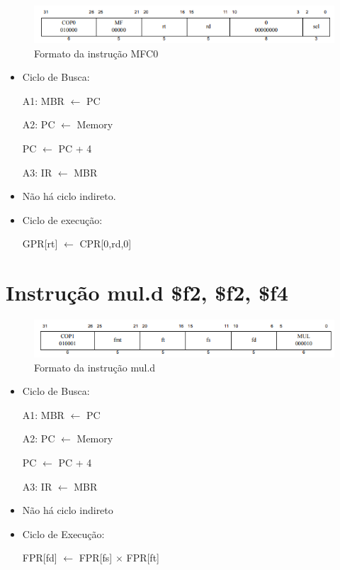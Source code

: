 \documentclass[
	12pt,				%
	oneside,			%
	a4paper,			%
	english,			%
	brazil				%
	]{abntex2ppgsi}
\begin{document}
\begin{figure}[h]
    \centering
    \includegraphics[width=1\linewidth]{4_15.png}
    \caption{Formato da instrução MFC0}
    \label{fig4_15}
\end{figure}

\begin{itemize}
    \item Ciclo de Busca:

    A1: MBR $\leftarrow$ PC

    A2: PC $\leftarrow$ Memory

    PC $\leftarrow$ PC + 4

    A3: IR $\leftarrow$ MBR
    \item Não há ciclo indireto.
    \item Ciclo de execução:

     GPR[rt] $\leftarrow$ CPR[0,rd,0]
\end{itemize}

\section{Instrução mul.d \$f2, \$f2, \$f4}

\begin{figure}[h]
    \centering
    \includegraphics[width=1\linewidth]{4_16.png}
    \caption{Formato da instrução mul.d}
    \label{fig4_16}
\end{figure}

\begin{itemize}
    \item Ciclo de Busca:

    A1: MBR $\leftarrow$ PC

    A2: PC $\leftarrow$ Memory

    PC $\leftarrow$ PC + 4

    A3: IR $\leftarrow$ MBR

    \item Não há ciclo indireto
    \item Ciclo de Execução:

    FPR[fd] $\leftarrow$ FPR[fs] $\times$ FPR[ft]
\end{itemize}
\end{document}
